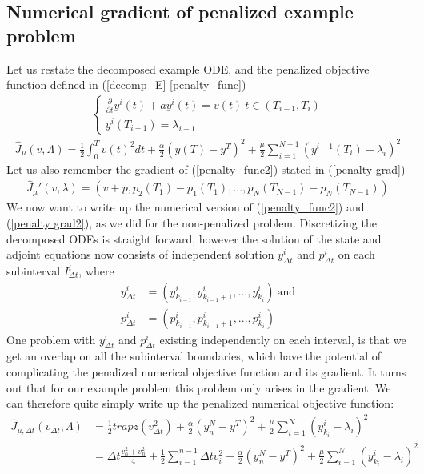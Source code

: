 \subsection{Numerical gradient of penalized example problem}
Let us restate the decomposed example ODE, and the penalized objective function defined in (\ref{decomp_E}-\ref{penalty_func})
\begin{align}
\left\{
     \begin{array}{lr}
       	\frac{\partial}{\partial t} y^i(t)+a y^i(t) = v(t) \ t\in(T_{i-1},T_{i})\\
       	y^i(T_{i-1})=\lambda_{i-1}
     \end{array}
   \right. \label{decomp_E2}
\end{align}
\begin{align}
\hat J_{\mu}(v,\Lambda) = \frac{1}{2}\int_0^Tv(t)^2dt + \frac{\alpha}{2}(y(T)-y^T)^2 + \frac{\mu}{2}\sum_{i=1}^{N-1}(y^{i-1}(T_i)-\lambda_i)^2 \label{penalty_func2}
\end{align}
Let us also remember the gradient of (\ref{penalty_func2}) stated in (\ref{penalty grad})
\begin{align}
\hat J_{\mu}'(v,\lambda) = (v+p,p_{2}(T_1) -p_{1}(T_1),..., p_{N}(T_{N-1}) -p_{N}(T_{N-1})) \label{penalty grad2}
\end{align}
We now want to write up the numerical version of (\ref{penalty_func2}) and (\ref{penalty grad2}), as we did for the non-penalized problem. Discretizing the decomposed ODEs is straight forward, however the solution of the state and adjoint equations now consists of independent solution $y_{\Delta t}^i$ and $p_{\Delta t}^i$ on each subinterval $I_{\Delta t}^i$, where 
\begin{align*}
y_{\Delta t}^i &= (y_{k_{i-1}}^i,y_{k_{i-1}+1}^i,...,y_{k_{i}}^i) \ \text{and} \\
p_{\Delta t}^i &= (p_{k_{i-1}}^i,p_{k_{i-1}+1}^i,...,p_{k_{i}}^i)
\end{align*} 
One problem with $y_{\Delta t}^i$ and $p_{\Delta t}^i$ existing independently on each interval, is that we get an overlap on all the subinterval boundaries, which have the potential of complicating the penalized numerical objective function and its gradient. It turns out that for our example problem this problem only arises in the gradient. We can therefore quite simply write up the penalized numerical objective function:
\begin{align}
\hat J_{\mu,\Delta t}(v_{\Delta t},\Lambda)&=\frac{1}{2} trapz(v_{\Delta t}^2)+ \frac{\alpha}{2}(y_n^{N}-y^T)^2 +\frac{\mu }{2}\sum_{i=1}^{N} (y_{k_i}^{i}-\lambda_i)^2\\
&=\Delta t\frac{v_0^2+v_n^2}{4} + \frac{1}{2}\sum_{i=1}^{n-1} \Delta t v_i^2 + \frac{\alpha}{2}(y_n^N-y^T)^2+\frac{\mu }{2}\sum_{i=1}^{N} (y_{k_i}^{i}-\lambda_i)^2 \label{pen disc f}
\end{align}
